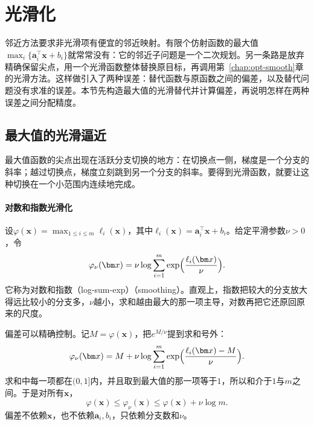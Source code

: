 \section{光滑化}
\label{sec:opt-ns-smoothing}

邻近方法要求非光滑项有便宜的邻近映射。有限个仿射函数的最大值$\max_i\{\bm a_i^\top\bm x+b_i\}$就常常没有：它的邻近子问题是一个二次规划。另一条路是放弃精确保留尖点，用一个光滑函数整体替换原目标，再调用第~\ref{chap:opt-smooth}章的光滑方法。这样做引入了两种误差：替代函数与原函数之间的偏差，以及替代问题没有求准的误差。本节先构造最大值的光滑替代并计算偏差，再说明怎样在两种误差之间分配精度。

\subsection{最大值的光滑逼近}
\label{sec:opt-ns-smooth-max}

最大值函数的尖点出现在活跃分支切换的地方：在切换点一侧，梯度是一个分支的斜率；越过切换点，梯度立刻跳到另一个分支的斜率。要得到光滑函数，就要让这种切换在一个小范围内连续地完成。

\paragraph{对数和指数光滑化}
设$\varphi(\bm x)=\max_{1\leq i\leq m}\ell_i(\bm x)$，其中$\ell_i(\bm x)=\bm a_i^\top\bm x+b_i$。给定平滑参数$\nu>0$，令
\begin{equation}
 \varphi_\nu(\bm x)=\nu\log\sum_{i=1}^m\exp\Bigl(\frac{\ell_i(\bm x)}\nu\Bigr).
 \label{eq:opt-ns-lse}
\end{equation}
它称为对数和指数（log-sum-exp）（smoothing）。直观上，指数把较大的分支放大得远比较小的分支多，$\nu$越小，求和越由最大的那一项主导，对数再把它还原回原来的尺度。

偏差可以精确控制。记$M=\varphi(\bm x)$，把$e^{M/\nu}$提到求和号外：
\[
 \varphi_\nu(\bm x)=M+\nu\log\sum_{i=1}^m\exp\Bigl(\frac{\ell_i(\bm x)-M}\nu\Bigr).
\]
求和中每一项都在$(0,1]$内，并且取到最大值的那一项等于$1$，所以和介于$1$与$m$之间。于是对所有$\bm x$，
\begin{equation}
 \varphi(\bm x)\leq\varphi_\nu(\bm x)\leq\varphi(\bm x)+\nu\log m .
 \label{eq:opt-ns-lse-gap}
\end{equation}
偏差不依赖$\bm x$，也不依赖$\bm a_i,b_i$，只依赖分支数和$\nu$。


